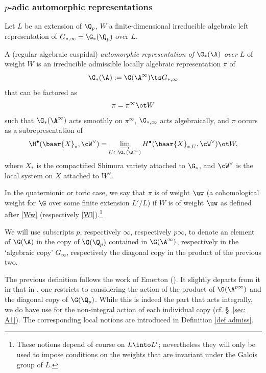 \subsubsection{$p$-adic automorphic representations}
Let $L$ be an extension of $\Q_{p}$, $W$ a finite-dimensional irreducible algebraic left representation of
$G_{*,\infty}=\G_{*}(\Q_{p})$  over $L$.
\begin{defi}
\notready\label{aut-def} A (regular algebraic cuspidal) \emph{automorphic representation of $\G_{*}(\A^{})$ over $L$ } of weight $W$
is an irreducible admissible locally algebraic representation $\pi$ of
$$\G_{*}(\A^{}):=\G(\A^{\infty})\ts G_{*,\infty}$$
 that can be factored as $$\pi=\pi^{\infty}\ot W$$
such that $\G_{*}(\A^{\infty})$ acts smoothly on $\pi^{\infty}$, $\G_{*, \infty}$ acts algebraically, and $\pi$ occurs as a subrepresentation of $$\H^{\bullet}(\baar{X}_{*}, \cW^{\vee})=\varinjlim_{U\subset \G_{*}(\A^{\infty})}H^{\bullet}(\baar{X}_{*, U}, \cW^{\vee})\ot W,$$
where $X_{*}$ is the compactified Shimura variety attached to $\G_{*}$, and $\cW^{\vee}$ is the local system on $X$ attached to $W^{\vee}$.



In the quaternionic or toric case, we say that $\pi$ is of weight $\uw$ (a cohomological weight for $\G$ over some finite extension $L'/L$) if $W$ is of weight $\uw$ as defined after \eqref{Ww} (respectively \eqref{Wl}).\footnote{These notions depend of course on $L\into L'$; nevertheless they will only be used to impose conditions on the weights that are invariant under the Galois group of $L$.}
\end{defi}
We will use subscripts $p$, respectively $\infty$, respectively $p\infty$, to denote an element of $\G(\A)$ in the copy of $\G(\Q_{p})$ contained in $\G(\A^{\infty})$, respectively in the  `algebraic copy' $G_{\infty}$, respectively the diagonal copy in the product of the previous two.

\begin{rema}
\notready The previous definition follows the work of Emerton  (\cite{emerton}). It slightly departs from it in  that in \cite{emerton}, one restricts to considering the action of the product of $\G(\A^{p\infty})$ and the diagonal copy of $\G(\Q_{p})$. While this is indeed the part that acts integrally, we do have use for the non-integral action of each individual copy (cf.  \S~\ref{sec: A1}). The corresponding local notions are introduced in Definition \ref{def admiss}.
\end{rema}

